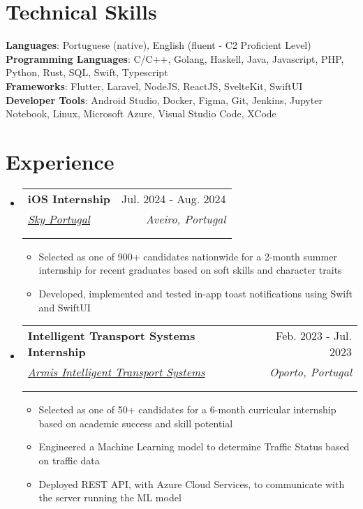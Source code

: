 \documentclass[a4paper,11pt]{article}
\makeatletter
\newcommand{\resumeItem}[1]{
  \item\small{
    {#1 \vspace{-2pt}}
  }
}
\newcommand{\resumeSubheading}[5]{
  \vspace{-2pt}\item
    \begin{tabular*}{0.97\textwidth}[t]{l@{\extracolsep{\fill}}r}
      \textbf{#1} & #2 \\
      \textit{\small#3} & \textit{\small #4} \\
      \if\relax\detokenize{#5}\relax
      \else
        \multicolumn{2}{@{}l}{\textit{\small#5}} \\
      \fi
    \end{tabular*}\vspace{-7pt}
}
\newcommand{\resumeSubSubheading}[2]{
    \item
    \begin{tabular*}{0.97\textwidth}{l@{\extracolsep{\fill}}r}
      \textit{\small#1} & \textit{\small #2} \\
    \end{tabular*}\vspace{-7pt}
}
\newcommand{\resumeSubHeadingListStart}{\begin{itemize}[leftmargin=0.15in, label={}]}
\newcommand{\resumeSubHeadingListEnd}{\end{itemize}}
\newcommand{\resumeItemListStart}{\begin{itemize}}
\newcommand{\resumeItemListEnd}{\end{itemize}\vspace{-5pt}}
\makeatother
\begin{document}
\section{Technical Skills}
 \begin{itemize}[leftmargin=0.15in, label={}]
    \small{\item{
	\textbf{Languages}{: Portuguese (native), English (fluent - C2 Proficient Level)} \\
    \textbf{Programming Languages}{: C/C++, Golang, Haskell, Java, Javascript, PHP, Python, Rust, SQL, Swift, Typescript} \\
    \textbf{Frameworks}{: Flutter, Laravel, NodeJS, ReactJS, SvelteKit, SwiftUI} \\
    \textbf{Developer Tools}{: Android Studio, Docker, Figma, Git, Jenkins, Jupyter Notebook, Linux, Microsoft Azure, Visual Studio Code, XCode}
    }}
\end{itemize}



\section{Experience}
  \resumeSubHeadingListStart

    \resumeSubheading
        {iOS Internship}{Jul. 2024 - Aug. 2024}
        {\href{https://www.sky.com/}{Sky Portugal}}{Aveiro, Portugal}
        {}
        \resumeItemListStart
            \resumeItem{Selected as one of 900+ candidates nationwide for a 2-month summer internship for recent graduates based on soft skills and character traits}
            \resumeItem{Developed, implemented and tested in-app toast notifications using Swift and SwiftUI}
        \resumeItemListEnd

    \resumeSubheading
      {Intelligent Transport Systems Internship}{Feb. 2023 - Jul. 2023}
      {\href{https://www.armisgroup.com/intelligent-transport-systems/}{Armis Intelligent Transport Systems}}{Oporto, Portugal}
      {}
      \resumeItemListStart
        \resumeItem{Selected as one of 50+ candidates for a 6-month curricular internship based on academic success and skill potential}
        \resumeItem{Engineered a Machine Learning model to determine Traffic Status based on traffic data}
        \resumeItem{Deployed REST API, with Azure Cloud Services, to communicate with the server running the ML model}
      \resumeItemListEnd
  \resumeSubHeadingListEnd
\leavevmode
\end{document}
